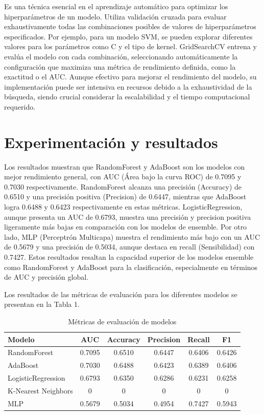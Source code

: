 \documentclass[
  number,
  preprint,
  3p,
  twocolumn]{elsarticle}
\begin{document}
Es una técnica esencial en el aprendizaje automático para optimizar los
hiperparámetros de un modelo. Utiliza validación cruzada para evaluar
exhaustivamente todas las combinaciones posibles de valores de
hiperparámetros especificados. Por ejemplo, para un modelo SVM, se
pueden explorar diferentes valores para los parámetros como C y el tipo
de kernel. GridSearchCV entrena y evalúa el modelo con cada combinación,
seleccionando automáticamente la configuración que maximiza una métrica
de rendimiento definida, como la exactitud o el AUC. Aunque efectivo
para mejorar el rendimiento del modelo, su implementación puede ser
intensiva en recursos debido a la exhaustividad de la búsqueda, siendo
crucial considerar la escalabilidad y el tiempo computacional requerido.

\section{Experimentación y
resultados}\label{experimentaciuxf3n-y-resultados}

Los resultados muestran que RandomForest y AdaBoost son los modelos con
mejor rendimiento general, con AUC (Área bajo la curva ROC) de 0.7095 y
0.7030 respectivamente. RandomForest alcanza una precisión (Accuracy) de
0.6510 y una precisión positiva (Precision) de 0.6447, mientras que
AdaBoost logra 0.6488 y 0.6423 respectivamente en estas métricas.
LogisticRegression, aunque presenta un AUC de 0.6793, muestra una
precisión y precision positiva ligeramente más bajas en comparación con
los modelos de ensemble. Por otro lado, MLP (Perceptrón Multicapa)
muestra el rendimiento más bajo con un AUC de 0.5679 y una precisión de
0.5034, aunque destaca en recall (Sensibilidad) con 0.7427. Estos
resultados resaltan la capacidad superior de los modelos ensemble como
RandomForest y AdaBoost para la clasificación, especialmente en términos
de AUC y precisión global.

Los resultados de las métricas de evaluación para los diferentes modelos
se presentan en la Tabla 1.

\begin{table}[ht]
\centering
\caption{Métricas de evaluación de modelos}
\begin{tabular}{|l|c|c|c|c|c|}
\hline
\textbf{Modelo} & \textbf{AUC} & \textbf{Accuracy} & \textbf{Precision} & \textbf{Recall} & \textbf{F1} \\
\hline
RandomForest & 0.7095 & 0.6510 & 0.6447 & 0.6406 & 0.6426 \\
AdaBoost & 0.7030 & 0.6488 & 0.6423 & 0.6389 & 0.6406 \\
LogisticRegression & 0.6793 & 0.6350 & 0.6286 & 0.6231 & 0.6258 \\
K-Nearest Neighbors & 0 & 0 & 0 & 0 & 0 \\
MLP & 0.5679 & 0.5034 & 0.4954 & 0.7427 & 0.5943 \\
\hline
\end{tabular}
\end{table}
\end{document}
